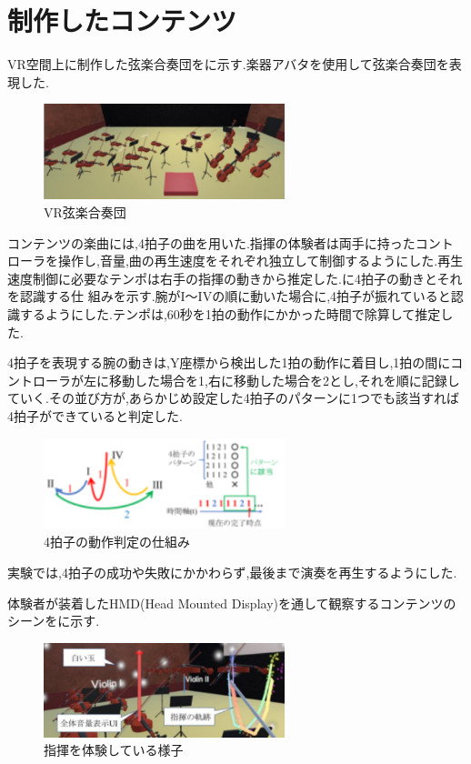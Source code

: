 \documentclass[uplatex]{jsarticle}   %
\begin{document}
\section{制作したコンテンツ}
VR空間上に制作した弦楽合奏団をに示す.楽器アバタを使用して弦楽合奏団を表現した.

 \begin{figure}[b]
 \centering
 \includegraphics[clip,width=7cm]{gaikan.png}
 \caption{VR弦楽合奏団}\label{fig:gaikan}
\end{figure}
コンテンツの楽曲には,4拍子の曲を用いた.指揮の体験者は両手に持ったコントローラを操作し,音量,曲の再生速度をそれぞれ独立して制御するようにした.再生速度制御に必要なテンポは右手の指揮の動きから推定した.に4拍子の動きとそれを認識する仕 組みを示す.腕がI～IVの順に動いた場合に,4拍子が振れていると認識するようにした.テンポは,60秒を1拍の動作にかかった時間で除算して推定した.

4拍子を表現する腕の動きは,Y座標から検出した1拍の動作に着目し,1拍の間にコントローラが左に移動した場合を1,右に移動した場合を2とし,それを順に記録していく.その並び方が,あらかじめ設定した4拍子のパターンに1つでも該当すれば4拍子ができていると判定した.

 \begin{figure}[b]
 \centering
 \includegraphics[clip,width=7cm]{hyousi.png}
 \caption{4拍子の動作判定の仕組み}\label{fig:hyousi}
\end{figure}
 
実験では,4拍子の成功や失敗にかかわらず,最後まで演奏を再生するようにした. 

体験者が装着したHMD(Head Mounted Display)を通して観察するコンテンツのシーンをに示す.

 \begin{figure}[b]
 \centering
 \includegraphics[clip,width=7cm]{sikumi.png}
 \caption{指揮を体験している様子}\label{fig:sikumi}
\end{figure}
\end{document}
